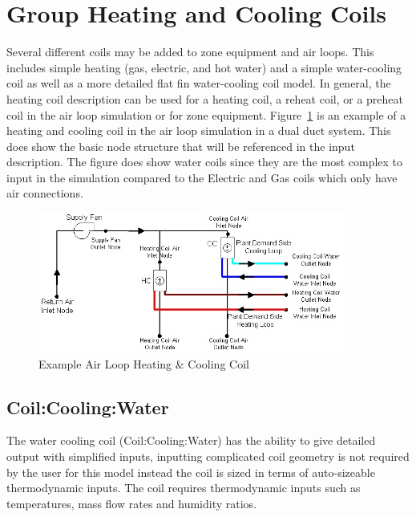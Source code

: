 \section{Group Heating and Cooling Coils}\label{group-heating-and-cooling-coils}

Several different coils may be added to zone equipment and air loops. This includes simple heating (gas, electric, and hot water) and a simple water-cooling coil as well as a more detailed flat fin water-cooling coil model. In general, the heating coil description can be used for a heating coil, a reheat coil, or a preheat coil in the air loop simulation or for zone equipment. Figure~\ref{fig:example-air-loop-heating-cooling-coil} is an example of a heating and cooling coil in the air loop simulation in a dual duct system. This does show the basic node structure that will be referenced in the input description. The figure does show water coils since they are the most complex to input in the simulation compared to the Electric and Gas coils which only have air connections.

\begin{figure}[hbtp] %
\centering
\includegraphics[width=0.9\textwidth, height=0.9\textheight, keepaspectratio=true]{media/image349.png}
\caption{Example Air Loop Heating \& Cooling Coil \protect \label{fig:example-air-loop-heating-cooling-coil}}
\end{figure}

\subsection{Coil:Cooling:Water}\label{coilcoolingwater}

The water cooling coil (Coil:Cooling:Water) has the ability to give detailed output with simplified inputs, inputting complicated coil geometry is not required by the user for this model instead the coil is sized in terms of auto-sizeable thermodynamic inputs. The coil requires thermodynamic inputs such as temperatures, mass flow rates and humidity ratios.

